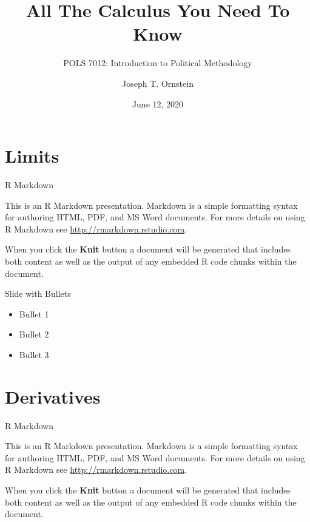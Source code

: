 \documentclass[
  ignorenonframetext,
]{beamer}
\title{All The Calculus You Need To Know}
\subtitle{POLS 7012: Introduction to Political Methodology}
\author{Joseph T. Ornstein}
\date{June 12, 2020}
\institute{University of Georgia}
\providecommand{\tightlist}{%
  \setlength{\itemsep}{0pt}\setlength{\parskip}{0pt}}
\begin{document}
\frame{\titlepage}

\begin{frame}
  \tableofcontents[hideallsubsections]
\end{frame}
\hypertarget{limits}{%
\section{Limits}\label{limits}}

\begin{frame}{R Markdown}
\protect\hypertarget{r-markdown}{}

This is an R Markdown presentation. Markdown is a simple formatting
syntax for authoring HTML, PDF, and MS Word documents. For more details
on using R Markdown see \url{http://rmarkdown.rstudio.com}.

When you click the \textbf{Knit} button a document will be generated
that includes both content as well as the output of any embedded R code
chunks within the document.

\end{frame}

\begin{frame}{Slide with Bullets}
\protect\hypertarget{slide-with-bullets}{}

\begin{itemize}
\tightlist
\item
  Bullet 1
\item
  Bullet 2
\item
  Bullet 3
\end{itemize}

\end{frame}

\hypertarget{derivatives}{%
\section{Derivatives}\label{derivatives}}

\begin{frame}{R Markdown}
\protect\hypertarget{r-markdown-1}{}

This is an R Markdown presentation. Markdown is a simple formatting
syntax for authoring HTML, PDF, and MS Word documents. For more details
on using R Markdown see \url{http://rmarkdown.rstudio.com}.

When you click the \textbf{Knit} button a document will be generated
that includes both content as well as the output of any embedded R code
chunks within the document.

\end{frame}
\end{document}
